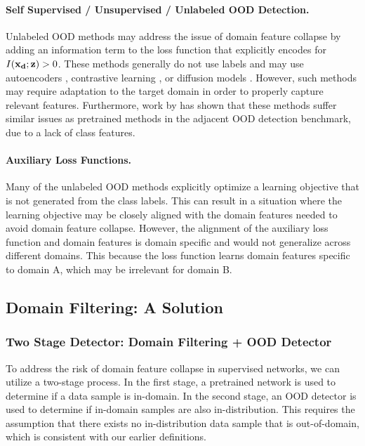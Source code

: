 \documentclass[letterpaper]{article} %
\theoremstyle{plain}
\theoremstyle{definition}
\theoremstyle{remark}
\begin{document}
\paragraph{Self Supervised / Unsupervised / Unlabeled OOD Detection.} Unlabeled OOD methods may address the issue of domain feature collapse by adding an information term to the loss function that explicitly encodes for $I({\mathbf{x}}_{\mathbf{d}};{\mathbf{z}}) > 0$. These methods generally do not use labels and may use autoencoders \cite{zhou2022rethinking}, contrastive learning \cite{sehwag2021ssd}, or diffusion models \cite{liu2023unsupervised}. However, such methods may require adaptation to the target domain in order to properly capture relevant features. Furthermore, work by \cite{yangcan} has shown that these methods suffer similar issues as pretrained methods in the adjacent OOD detection benchmark, due to a lack of class features.

\paragraph{Auxiliary Loss Functions.} Many of the unlabeled OOD methods explicitly optimize a learning objective that is not generated from the class labels. This can result in a situation where the learning objective may be closely aligned with the domain features needed to avoid domain feature collapse. However, the alignment of the auxiliary loss function and domain features is domain specific and would not generalize across different domains. This because the loss function learns domain features specific to domain A, which may be irrelevant for domain B. 

\subsection{Domain Filtering: A Solution}
\label{sec:domain_filtering}

\subsubsection{Two Stage Detector: Domain Filtering + OOD Detector}

To address the risk of domain feature collapse in supervised networks, we can utilize a two-stage process. In the first stage, a pretrained network is used to determine if a data sample is in-domain. In the second stage, an OOD detector is used to determine if in-domain samples are also in-distribution. This requires the assumption that there exists no in-distribution data sample that is out-of-domain, which is consistent with our earlier definitions.
\end{document}
